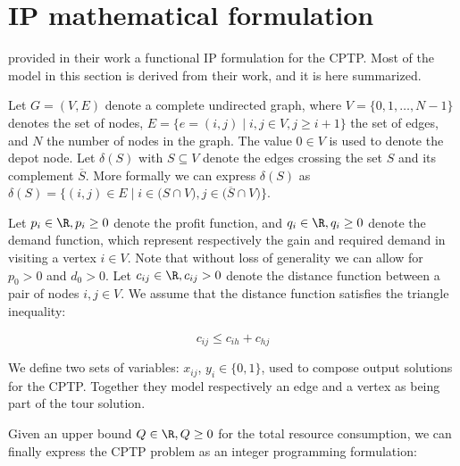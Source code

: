 \chapter{IP mathematical formulation}

\cite{Jepsen2014} provided in their work a functional IP formulation for the CPTP.
Most of the model in this section is derived from their work, and it is here summarized.

Let $G = \left(V, E \right)$ denote a complete undirected graph, where $V = \lbrace 0, 1, \dots, N - 1 \rbrace$ denotes the set of nodes,
$E = \lbrace  e = (i, j) \mid i,j \in V, j \ge i + 1 \rbrace$ the set of edges, and $N$ the number of nodes in the graph.
The value $0 \in V$ is used to denote the depot node.
Let $\delta(S)$ with $S \subseteq V$ denote the edges crossing the set $S$ and its complement $\overline{S}$.
More formally we can express $\delta(S)$ as $\delta(S) = \lbrace (i, j) \in E \mid i \in \lparen S \cap V \rparen, j \in \lparen \overline{S} \cap V \rparen \rbrace$.

Let $p_{i} \in \R, p_{i} \ge 0$ denote the profit function, and $q_{i} \in \R, q_{i} \ge 0$ denote the demand function, which represent respectively the gain and required demand in visiting a vertex $i \in V$.
Note that without loss of generality we can allow for $p_{0} > 0$ and $d_{0} > 0$.
Let $c_{ij} \in \R, c_{ij} > 0$ denote the distance function between a pair of nodes  $i, j \in V$.
We assume that the distance function satisfies the triangle inequality:

\begin{equation}
	c_{ij} \le c_{ih} + c_{hj}
\end{equation}


We define two sets of variables: $x_{ij}$, $y_{i} \in \lbrace 0, 1 \rbrace$, used to compose output solutions for the CPTP.
Together they model respectively an edge and a vertex as being part of the tour solution.

Given an upper bound $Q \in \R,Q \ge 0$ for the total resource consumption, we can finally express the CPTP problem as an integer programming formulation:


